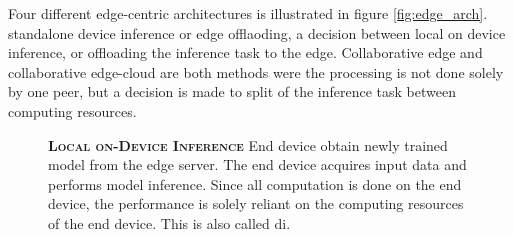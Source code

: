 Four different edge-centric architectures is illustrated in figure \ref{fig:edge_arch}. \protect{} standalone device inference or \protect{} edge offlaoding, a decision between local on device inference, or offloading the inference task to the edge. Collaborative edge\protect{} and collaborative edge-cloud \protect{} are both methods were the processing is not done solely by one peer, but a decision is made to split of the inference task between computing resources.
\begin{figure}
	\begin{minipage}{0.65\linewidth}
		\textbf{\protect{} \textsc{Local on-Device Inference}}
		\color{caption-color} \newline
		End device obtain newly trained model from the edge server. The end device acquires input data and performs model inference. Since all computation is done on the end device, the performance is solely reliant on the computing resources of the end device. This is also called \acrlong{di}.
	\end{minipage}%
	\hfill
	\begin{minipage}{0.3\linewidth}
		\centering
		\captionsetup[subfigure]{justification=centering}
		\begin{figure}
			\centering
		\end{figure}
	\end{minipage}
	

\end{figure}

